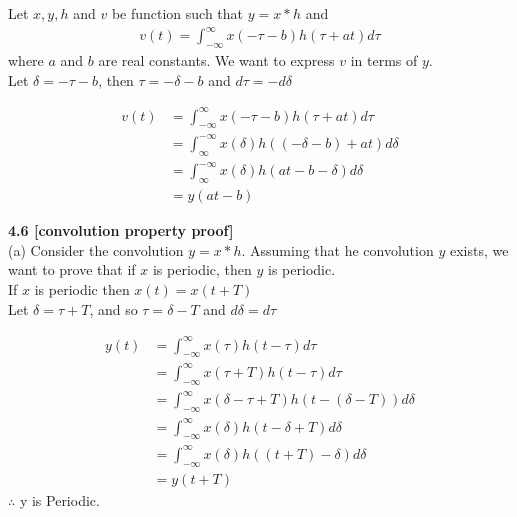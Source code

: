 \documentclass{article}
\begin{document}
Let $x,y,h$ and $v$ be function such that $y = x * h$ and
\begin{equation*}
\begin{split}
    v(t) = \int_{-\infty}^{\infty} x(-\tau - b)h(\tau + at)d\tau
\end{split}
\end{equation*}
where $a$ and $b$ are real constants. We want to express $v$ in terms of $y$.\\

Let $\delta = -\tau - b$, then $\tau = -\delta - b$ and $d\tau = -d\delta$

\begin{equation*}
\begin{split}
    v(t) &= \int_{-\infty}^{\infty} x(-\tau - b)h(\tau + at)d\tau\\
    &= \int_{\infty}^{-\infty} x(\delta)h((-\delta - b) + at) d\delta\\
    &= \int_{\infty}^{-\infty} x(\delta)h(at - b - \delta) d\delta\\
    &= y(at - b)
\end{split}
\end{equation*}


{\bf 4.6 [convolution property proof]}\\
(a)
Consider the convolution $y = x * h$. Assuming that he convolution $y$ exists, we want to prove that if $x$ is periodic, then $y$ is periodic.\\

If $x$ is periodic then $x(t) = x(t + T)$\\
Let $\delta = \tau + T$, and so $\tau = \delta - T$ and $d\delta = d\tau$

\begin{equation*}
\begin{split}
    y(t) &= \int_{-\infty}^{\infty} x(\tau)h(t - \tau)d\tau\\
    &= \int_{-\infty}^{\infty} x(\tau + T)h(t - \tau)d\tau\\
    &= \int_{-\infty}^{\infty} x(\delta - \tau + T)h(t - (\delta - T))d\delta\\
    &= \int_{-\infty}^{\infty} x(\delta)h(t - \delta + T)d\delta\\
    &= \int_{-\infty}^{\infty} x(\delta)h((t + T)- \delta)d\delta\\
    &= y(t + T)
\end{split}
\end{equation*}
$\therefore$ y is Periodic.
\end{document}
